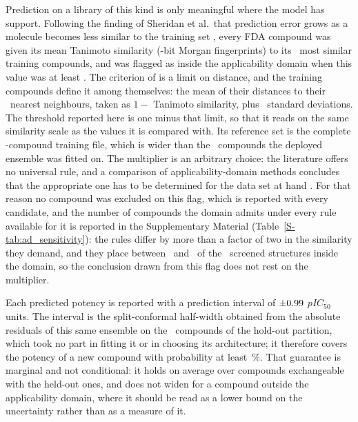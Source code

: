 Prediction on a library of this kind is only meaningful where the model has support. Following the finding of Sheridan
et al.\ that prediction error grows as a molecule becomes less similar to the training set \citep{sheridan2004}, every
FDA compound was given its mean Tanimoto similarity (\MorganNFeaturesTotal-bit Morgan fingerprints) to its \ScreenADNeighbors\ most
similar training compounds, and was flagged as inside the applicability domain when this value was at least
\ScreenADMinSimilarity. The criterion of \citet{sahigara2012} is a limit on distance, and the training compounds define
it among themselves: the mean of their distances to their \ScreenADNeighbors\ nearest neighbours, taken as $1 -$
Tanimoto similarity, plus \ScreenADZ\ standard deviations. The threshold reported here is one minus that limit, so that
it reads on the same similarity scale as the values it is compared with. Its reference set is the complete
\NCompounds-compound training file, which is wider than the \ExpNDev\ compounds the deployed ensemble was fitted on.
The multiplier is an arbitrary choice: the literature
offers no universal rule, and a comparison of applicability-domain methods concludes that the appropriate one has to be
determined for the data set at hand \citep{heberger2023}. For that reason no compound was excluded on this flag, which
is reported with every candidate, and the number of compounds the domain admits under every rule available for it is
reported in the Supplementary Material (Table~\ref{S-tab:ad_sensitivity}): the rules differ by more than a factor of two in the similarity
they demand, and they place between \ScreenADSensitivityMin\ and \ScreenADSensitivityMax\ of the \ScreenNStructural\
screened structures inside the domain, so the conclusion drawn from this flag does not rest on the multiplier.

Each predicted potency is reported with a prediction interval of $\pm0.99$ $pIC_{50}$ units. The
interval is the split-conformal half-width \citep{lei2018} obtained from the absolute residuals of this same ensemble
on the \ScreenConformalNCal\ compounds of the hold-out partition, which took no part in fitting it or in choosing its
architecture; it therefore covers the potency of a new compound with probability at least
\ScreenConformalCoverage\,\%. That guarantee is marginal and not conditional: it holds on average over compounds
exchangeable with the held-out ones, and does not widen for a compound outside the applicability domain, where it
should be read as a lower bound on the uncertainty rather than as a measure of it.

